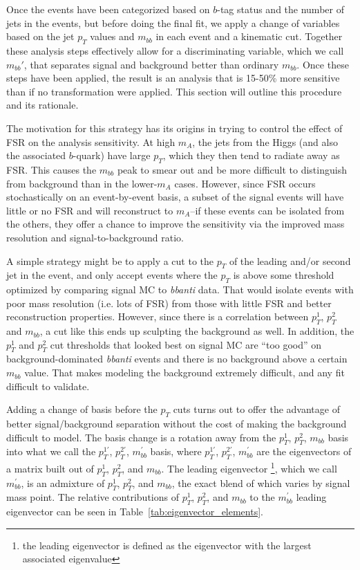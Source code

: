 Once the events have been categorized based on $b$-tag status and the number of jets in the
events, but before doing the final fit, we apply a change of variables based on the jet
$p_T$ values and $m_{bb}$ in each event and a kinematic cut.  Together these analysis 
steps effectively allow for a discriminating variable, which we call $m_{bb}'$, that
separates signal and background better than ordinary $m_{bb}$.  Once these steps have
been applied, the result is an analysis that is 15-50\% more sensitive
than if no transformation were applied.  This section will 
outline this procedure and its rationale.  

The motivation for this strategy has its origins in trying to control the effect of
FSR on the analysis sensitivity.  At high $m_A$, the jets from the Higgs (and also 
the associated $b$-quark) have large $p_T$, which they then tend to radiate away 
as FSR.  This causes the $m_{bb}$ peak to smear out and be more difficult to 
distinguish from background than in the lower-$m_A$ cases.  However, since FSR
occurs stochastically on an event-by-event basis, a subset of the signal events
will have little or no FSR and will reconstruct to $m_A$--if these events 
can be isolated from the others, they offer a chance to improve the sensitivity
via the improved mass resolution and signal-to-background ratio. 

A simple strategy might be to apply a cut to the $p_T$ of the leading and/or 
second jet in the event, and only accept events where the $p_T$ is above some
threshold optimized by comparing signal MC to \textit{bbanti} data.  
That would isolate events with poor mass resolution (i.e. lots of FSR) from
those with little FSR and better reconstruction properties.  However, since
there is a correlation between $p_T^1$, $p_T^2$ and $m_{bb}$, a cut like
this ends up sculpting the background as well.  In addition, the $p_T^1$ and
$p_T^2$ cut thresholds that looked best on signal MC are ``too good'' on 
background-dominated \textit{bbanti} events and there is no background
above a certain $m_{bb}$ value.  That makes modeling the background extremely 
difficult, and any fit difficult to validate.  

Adding a change of basis before the $p_T$ cuts turns out to offer the advantage
of better signal/background separation without the cost of making the background
difficult to model.  The basis change is a rotation away from the $p_T^1$, 
$p_T^2$, $m_{bb}$ basis into what we call the $p_T^{1'}$, $p_T^{2'}$, $m_{bb}^{'}$
basis, where $p_T^{1'}$, $p_T^{2'}$, $m_{bb}^{'}$ are the eigenvectors of 
a matrix built out of $p_T^1$, $p_T^2$, and $m_{bb}$.  The leading eigenvector 
\footnote{the leading eigenvector is defined as the eigenvector with the largest
associated eigenvalue}, which we call $m_{bb}^{'}$, is an admixture of 
$p_T^1$, $p_T^2$, and $m_{bb}$, the exact blend of which varies by signal mass
point.  The relative contributions of $p_T^1$, $p_T^2$, and $m_{bb}$ to the $m_{bb}^{'}$
leading eigenvector can be seen in Table~\ref{tab:eigenvector_elements}.


